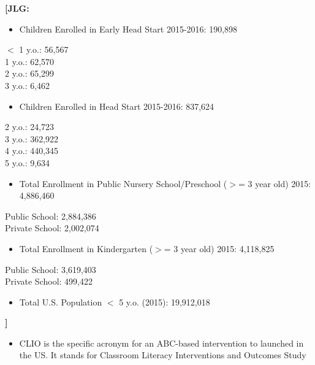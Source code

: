 \documentclass[static]{JJH-Beamer}
\begin{document}
\clearpage

\textbf{[JLG:}

\begin{itemize}
\item Children Enrolled in Early Head Start 2015-2016: 190,898
\end{itemize}

\noindent $<$ 1 y.o.: 56,567\\
1 y.o.: 62,570\\
2 y.o.: 65,299\\
3 y.o.: 6,462

\begin{itemize}
\item Children Enrolled in Head Start 2015-2016: 837,624
\end{itemize}
2 y.o.: 24,723\\
3 y.o.: 362,922\\
4 y.o.: 440,345\\
5 y.o.: 9,634

\begin{itemize}
\item Total Enrollment in Public Nursery School/Preschool ($>$= 3 year old) 2015: 4,886,460
\end{itemize}
Public School: 2,884,386\\
Private School: 2,002,074\\

\begin{itemize}
\item Total Enrollment in Kindergarten ($>$= 3 year old) 2015: 4,118,825
\end{itemize}
Public School: 3,619,403\\
Private School: 499,422

\begin{itemize}
\item Total U.S. Population $<$ 5 y.o. (2015): 19,912,018
\end{itemize} \textbf{]}

\clearpage


\begin{itemize}
\item CLIO is the specific acronym for an ABC-based intervention to launched in the US. It stands for Classroom Literacy Interventions and Outcomes Study
\end{itemize}

\end{document}
